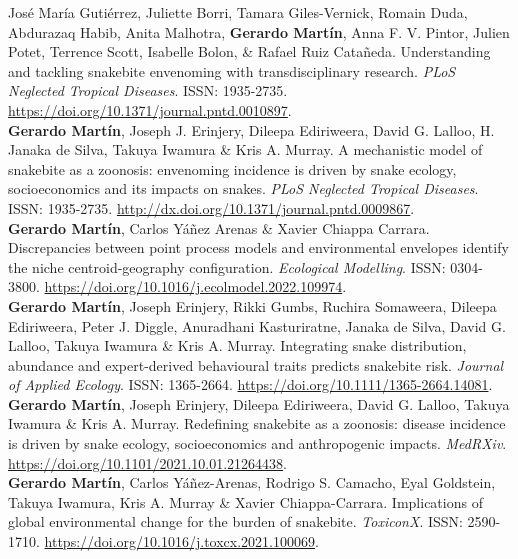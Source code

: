 \documentclass[11pt, letter]{article}
\newcommand{\years}[1]{\marginnote{\scriptsize #1}}
\begin{document}
\years{2022} Jos\'e Mar\'ia Guti\'errez, Juliette Borri, Tamara Giles-Vernick, Romain Duda, Abdurazaq Habib, Anita Malhotra, \textbf{Gerardo Mart\'in}, Anna F. V. Pintor, Julien Potet, Terrence Scott, Isabelle Bolon, \& Rafael Ruiz Cata\~neda. Understanding and tackling snakebite envenoming with transdisciplinary research. \emph{PLoS Neglected Tropical Diseases}. ISSN: 1935-2735. \url{https://doi.org/10.1371/journal.pntd.0010897}. \\

\years{2022} \textbf{Gerardo Mart\'in}, Joseph J. Erinjery, Dileepa Ediriweera, David G. Lalloo, H. Janaka de Silva, Takuya Iwamura \& Kris A. Murray. A mechanistic model of snakebite as a zoonosis: envenoming incidence is driven by snake ecology, socioeconomics and its impacts on snakes. \emph{PLoS Neglected Tropical Diseases}. ISSN: 1935-2735. \url{http://dx.doi.org/10.1371/journal.pntd.0009867}.\\

\years{2022} \textbf{Gerardo Mart\'in}, Carlos Y\'a\~nez Arenas \& Xavier Chiappa Carrara. Discrepancies between point process models and environmental envelopes identify the niche centroid-geography configuration. \emph{Ecological Modelling}. ISSN: 0304-3800. \url{https://doi.org/10.1016/j.ecolmodel.2022.109974}.\\

\years{2021} \textbf{Gerardo Mart\'in}, Joseph Erinjery, Rikki Gumbs, Ruchira Somaweera, Dileepa Ediriweera, Peter J. Diggle, Anuradhani Kasturiratne, Janaka de Silva, David G. Lalloo, Takuya Iwamura \& Kris A. Murray. Integrating snake distribution, abundance and expert-derived behavioural traits predicts snakebite risk. \emph{Journal of Applied Ecology}. ISSN: 1365-2664. \url{https://doi.org/10.1111/1365-2664.14081}.\\

\years{2021} \textbf{Gerardo Mart\'in}, Joseph Erinjery, Dileepa Ediriweera, David G. Lalloo, Takuya Iwamura \& Kris A. Murray. Redefining snakebite as a zoonosis: disease incidence is driven by snake ecology, socioeconomics and anthropogenic impacts. \emph{MedRXiv}. \url{https://doi.org/10.1101/2021.10.01.21264438}.\\

\years{2021} \textbf{Gerardo Martín}, Carlos Y\'a\~nez-Arenas, Rodrigo S. Camacho, Eyal Goldstein, Takuya Iwamura, Kris A. Murray \& Xavier Chiappa-Carrara. Implications of global environmental change for the burden of snakebite. \emph{ToxiconX}. ISSN: 2590-1710. \url{https://doi.org/10.1016/j.toxcx.2021.100069}.\\
\end{document}
